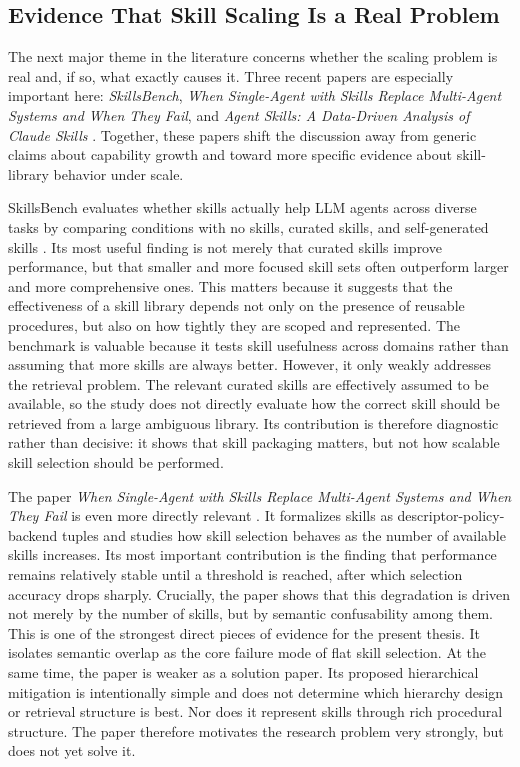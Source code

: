 \documentclass[a4paper]{article}
\begin{document}
\subsection{Evidence That Skill Scaling Is a Real Problem}
The next major theme in the literature concerns whether the scaling problem is real and, if so, what exactly causes it. Three recent papers are especially important here: \emph{SkillsBench}, \emph{When Single-Agent with Skills Replace Multi-Agent Systems and When They Fail}, and \emph{Agent Skills: A Data-Driven Analysis of Claude Skills} \cite{li2026skillsbench, li2026singleagent, ling2026claudeskills}. Together, these papers shift the discussion away from generic claims about capability growth and toward more specific evidence about skill-library behavior under scale.

SkillsBench evaluates whether skills actually help LLM agents across diverse tasks by comparing conditions with no skills, curated skills, and self-generated skills \cite{li2026skillsbench}. Its most useful finding is not merely that curated skills improve performance, but that smaller and more focused skill sets often outperform larger and more comprehensive ones. This matters because it suggests that the effectiveness of a skill library depends not only on the presence of reusable procedures, but also on how tightly they are scoped and represented. The benchmark is valuable because it tests skill usefulness across domains rather than assuming that more skills are always better. However, it only weakly addresses the retrieval problem. The relevant curated skills are effectively assumed to be available, so the study does not directly evaluate how the correct skill should be retrieved from a large ambiguous library. Its contribution is therefore diagnostic rather than decisive: it shows that skill packaging matters, but not how scalable skill selection should be performed.

The paper \emph{When Single-Agent with Skills Replace Multi-Agent Systems and When They Fail} is even more directly relevant \cite{li2026singleagent}. It formalizes skills as descriptor-policy-backend tuples and studies how skill selection behaves as the number of available skills increases. Its most important contribution is the finding that performance remains relatively stable until a threshold is reached, after which selection accuracy drops sharply. Crucially, the paper shows that this degradation is driven not merely by the number of skills, but by semantic confusability among them. This is one of the strongest direct pieces of evidence for the present thesis. It isolates semantic overlap as the core failure mode of flat skill selection. At the same time, the paper is weaker as a solution paper. Its proposed hierarchical mitigation is intentionally simple and does not determine which hierarchy design or retrieval structure is best. Nor does it represent skills through rich procedural structure. The paper therefore motivates the research problem very strongly, but does not yet solve it.
\end{document}

